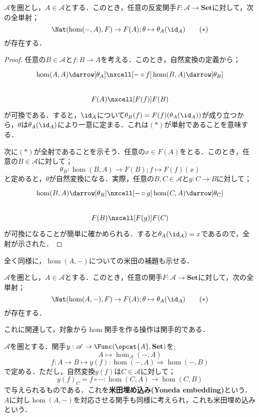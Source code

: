 \begin{thm}[米田の補題]
	$\mathscr{A}$を圏とし，$A\in\mathscr{A}$とする．このとき，任意の反変関手$F:\mathscr{A}\to\mathbf{Set}$に対して，次の全単射；
	\[\Nat(\hom(-,A),F)\to F(A);\theta\mapsto\theta_A(\id_A)\tag{$\ast$}\]
	が存在する．
\end{thm}
\begin{proof}
	任意の$B\in\mathscr{A}$と$f:B\to A$を考える．このとき，自然変換の定義から；
	\[\begin{tikzcd}
		\hom(A,A)\darrow[\theta_A]\nxcell[-\circ f]\hom(B,A)\darrow[\theta_B]\\
		F(A)\nxcell[F(f)]F(B)
	\end{tikzcd}\]
	が可換である．すると，$\id_A$について$\theta_B(f)=F(f)(\theta_A(\id_A))$が成り立つから，$\theta$は$\theta_A(\id_A)$により一意に定まる．これは$(\ast)$が単射であることを意味する．
	
	次に$(\ast)$が全射であることを示そう．任意の$x\in F(A)$をとる．このとき，任意の$B\in\mathscr{A}$に対して；
	\[\theta_B:\hom(B,A)\to F(B);f\mapsto F(f)(x)\]
	と定めると，$\theta$が自然変換になる．実際，任意の$B,C\in\mathscr{A}$と$g:C\to B$に対して；
	\[\begin{tikzcd}
		\hom(B,A)\darrow[\theta_B]\nxcell[-\circ g]\hom(C,A)\darrow[\theta_C]\\
		F(B)\nxcell[F(g)]F(C)
	\end{tikzcd}\]
	が可換になることが簡単に確かめられる．すると$\theta_A(\id_A)=x$であるので，全射が示された．
\end{proof}
全く同様に，$\hom(A,-)$についての米田の補題も示せる．

\begin{thm}
	$\mathscr{A}$を圏とし，$A\in\mathscr{A}$とする．このとき，任意の関手$F:\mathscr{A}\to\mathbf{Set}$に対して，次の全単射；
	\[\Nat(\hom(A,-),F)\to F(A);\theta\mapsto\theta_A(\id_A)\tag{$\ast$}\]
	が存在する．
\end{thm}

これに関連して，対象から$\hom$関手を作る操作は関手的である．

\begin{defi}[米田埋め込み]
	$\mathscr{A}$を圏とする．関手$y:\mathscr{A}\to\Func(\opcat{A},\mathbf{Set})$を;
	\[A\mapsto\hom_{\mathscr{A}}(-,A)\]
	\[f:A\to B\mapsto y(f):\hom(-,A)\Rightarrow\hom(-,B)\]
	で定める．ただし，自然変換$y(f)$は$C\in\mathscr{A}$に対して；
	\[y(f)_C=f\circ -:\hom(C,A)\to\hom(C,B)\]
	で与えられるものである．これを\textbf{米田埋め込み(Yoneda embedding)}という．$A$に対し$\hom(A,-)$を対応させる関手も同様に考えられ，これも米田埋め込みという．
\end{defi}

